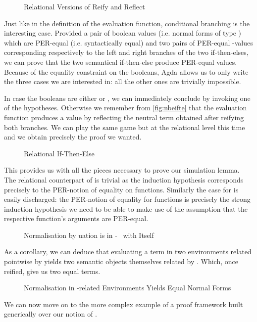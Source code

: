 \begin{figure}[h]
\caption{Relational Versions of Reify and Reflect\label{fig:nbeperreifyreflect}}
\end{figure}

Just like in the definition of the evaluation function, conditional branching is the
interesting case. Provided a pair of boolean values (i.e. normal forms of type
) which are PER-equal (i.e. syntactically equal) and two pairs of PER-equal
-values corresponding respectively to the left and right branches of the two
if-then-elses, we can prove that the two semantical if-then-else produce PER-equal values.
Because of the equality constraint on the booleans, Agda allows us to only write the
three cases we are interested in: all the other ones are trivially impossible.

In case the booleans are either  or , we can immediately conclude
by invoking one of the hypotheses. Otherwise we remember from \cref{fig:nbeifte}
that the evaluation function
produces a value by reflecting the neutral term obtained after reifying both branches.
We can play the same game but at the relational level this time and we obtain precisely
the proof we wanted.

\begin{figure}[h]
\caption{Relational If-Then-Else\label{fig:nbeiftenelser}}
\end{figure}

This provides us with all the pieces necessary to prove our simulation lemma. The relational
counterpart of  is trivial as the induction hypothesis corresponds precisely to
the PER-notion of equality on functions. Similarly the case for  is easily discharged:
the PER-notion of equality for functions is precisely the strong induction hypothesis we need
to be able to make use of the assumption that the respective function's arguments are PER-equal.

\begin{figure}[h]
\caption{Normalisation by uation is in -~ with Itself\label{fig:nbeselfsim}}
\end{figure}

As a corollary, we can deduce that evaluating a term in two environments related pointwise
by  yields two semantic objects themselves related by . Which, once reified,
give us two equal terms.

\begin{figure}[h]
\caption{Normalisation in -related Environments Yields Equal Normal Forms}
\end{figure}

We can now move on to the more complex example of a proof framework built generically
over our notion of .
